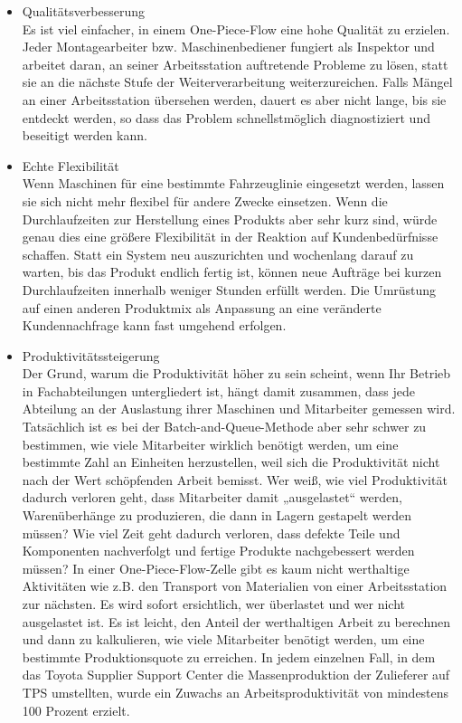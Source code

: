 \documentclass[a4paper,12pt]{scrartcl}
\begin{document}
\begin{itemize}
    \item Qualitätsverbesserung\\
    Es ist viel einfacher, in einem One-Piece-Flow eine hohe Qualität zu erzielen. Jeder Montagearbeiter bzw. Maschinenbediener fungiert als Inspektor und arbeitet daran, an seiner Arbeitsstation auftretende Probleme zu lösen, statt sie an die nächste Stufe der Weiterverarbeitung weiterzureichen. Falls Mängel an einer Arbeitsstation übersehen werden, dauert es aber nicht lange, bis sie entdeckt werden, so dass das Problem schnellstmöglich diagnostiziert und beseitigt werden kann.
    \item Echte Flexibilität\\
    Wenn Maschinen für eine bestimmte Fahrzeuglinie eingesetzt werden, lassen sie sich nicht mehr flexibel für andere Zwecke einsetzen. Wenn die Durchlaufzeiten zur Herstellung eines Produkts aber sehr kurz sind, würde genau dies eine größere Flexibilität in der Reaktion auf Kundenbedürfnisse schaffen. Statt ein System neu auszurichten und wochenlang darauf zu warten, bis das Produkt endlich fertig ist, können neue Aufträge bei kurzen Durchlaufzeiten innerhalb weniger Stunden erfüllt werden. Die Umrüstung auf einen anderen Produktmix als Anpassung an eine veränderte Kundennachfrage kann fast umgehend erfolgen.
    \item Produktivitätssteigerung\\
    Der Grund, warum die Produktivität höher zu sein scheint, wenn Ihr Betrieb in Fachabteilungen untergliedert ist, hängt damit zusammen, dass jede Abteilung an der Auslastung ihrer Maschinen und Mitarbeiter gemessen wird. Tatsächlich ist es bei der Batch-and-Queue-Methode aber sehr schwer zu bestimmen, wie viele Mitarbeiter wirklich benötigt werden, um eine bestimmte Zahl an Einheiten herzustellen, weil sich die Produktivität nicht nach der Wert schöpfenden Arbeit bemisst. Wer weiß, wie viel Produktivität dadurch verloren geht, dass Mitarbeiter damit „ausgelastet“ werden, Warenüberhänge zu produzieren, die dann in Lagern gestapelt werden müssen? Wie viel Zeit geht dadurch verloren, dass defekte Teile und Komponenten nachverfolgt und fertige Produkte nachgebessert werden müssen? In einer One-Piece-Flow-Zelle gibt es kaum nicht werthaltige Aktivitäten wie z.B. den Transport von Materialien von einer Arbeitsstation zur nächsten. Es wird sofort ersichtlich, wer überlastet und wer nicht ausgelastet ist. Es ist leicht, den Anteil der werthaltigen Arbeit zu berechnen und dann zu kalkulieren, wie viele Mitarbeiter benötigt werden, um eine bestimmte Produktionsquote zu erreichen. In jedem einzelnen Fall, in dem das Toyota Supplier Support Center die Massenproduktion der Zulieferer auf TPS umstellten, wurde ein Zuwachs an Arbeitsproduktivität von mindestens 100 Prozent erzielt.

\end{itemize}
\end{document}
